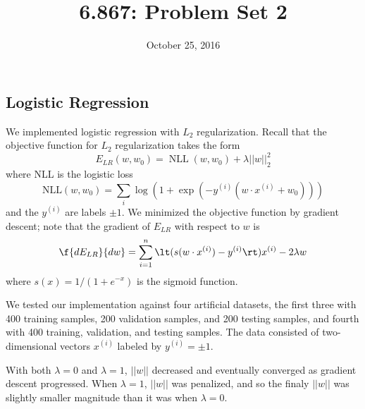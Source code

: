 \documentclass{article}
\title{6.867: Problem Set 2}
\date{October 25, 2016}
\DeclareMathOperator{\NLL}{NLL}
\newcommand{\sind}[1]{^{(#1)}}
\begin{document}
\maketitle

\begin{multicols}{2}


\section{Logistic Regression}
\label{sec:lr}

We implemented logistic regression with $L_2$ regularization.
Recall that the objective function for $L_2$ regularization takes the form
\begin{equation}
    E_{LR}(w, w_0) = \NLL(w, w_0) + \lambda ||w||_2^2
\end{equation}
where NLL is the logistic loss
\begin{equation}
    \text{NLL}(w, w_0) = \sum_i{\log(1+\exp(-y^{(i)}(w\cdot x^{(i)}+w_0)))}
\end{equation}
and the $y\sind{i}$ are labels $\pm 1$.
We minimized the objective function by gradient descent;
note that the gradient of $E_{LR}$ with respect to $w$ is
\begin{equation}
    \f{d E_{LR}}{dw} = \sum_{i=1}^n\lt(s(w\cdot x^{(i)})-y^{(i)}\rt)x^{(i)} - 2\lambda w
\end{equation}
where $s(x) = 1/(1+e^{-x})$ is the sigmoid function.

We tested our implementation against four artificial datasets,
the first three with 400 training samples,
200 validation samples,
and 200 testing samples, and fourth with 400 training, validation, and testing samples.
The data consisted of two-dimensional vectors $x\sind{i}$ labeled by $y\sind{i} = \pm1$.

With both $\lambda=0$ and $\lambda=1$,
$||w||$ decreased and eventually converged
as gradient descent progressed.
When $\lambda = 1$, $||w||$ was penalized,
and so the finaly $||w||$ was slightly smaller magnitude
than it was when $\lambda = 0$.



\end{multicols}
\end{document}
